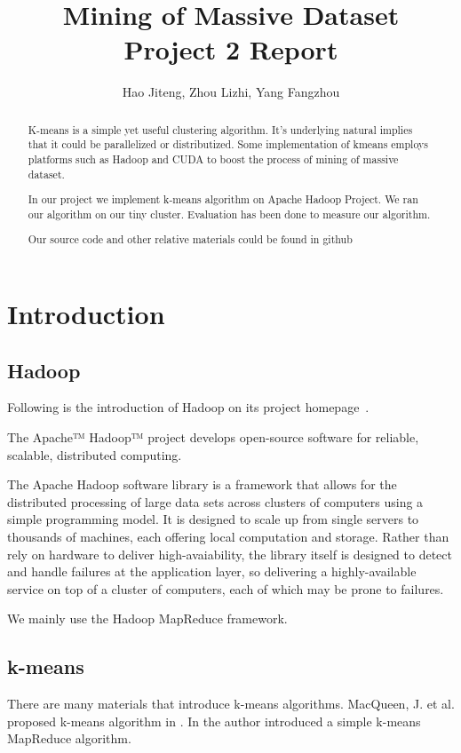 \documentclass[a4paper,11pt]{article}
\title{
Mining of Massive Dataset\\
Project 2 Report
}
\author{Hao Jiteng, Zhou Lizhi, Yang Fangzhou}
\begin{document}
\maketitle

\begin{abstract}
K-means is a simple yet useful clustering algorithm. It's underlying natural
implies that it could be parallelized or distributized. Some implementation of
kmeans employs platforms such as Hadoop and CUDA to boost the process of mining
of massive dataset.

In our project we implement k-means algorithm on Apache Hadoop Project. We ran
our algorithm on our tiny cluster. Evaluation has been done to measure our
algorithm.

Our source code and other relative materials could be found in github~\cite{github:source}
\end{abstract}

\section{Introduction}
\subsection{Hadoop}
Following is the introduction of Hadoop on its project
homepage~\cite{apache:hadoop}.

The Apache™ Hadoop™ project develops open-source software for reliable,
scalable, distributed computing.

The Apache Hadoop software library is a framework that allows for the
distributed processing of large data sets across clusters of computers using a
simple programming model. It is designed to scale up from single servers to
thousands of machines, each offering local computation and storage. Rather than
rely on hardware to deliver high-avaiability, the library itself is designed to
detect and handle failures at the application layer, so delivering a
highly-available service on top of a cluster of computers, each of which may
be prone to failures.

We mainly use the Hadoop MapReduce framework.

\subsection{k-means}
There are many materials that introduce k-means
algorithms. MacQueen, J. et al. proposed k-means algorithm in
\cite{algo:kmeans1}. In \cite{algo:kmeans2} the author introduced a simple
k-means MapReduce algorithm. 
\end{document}
